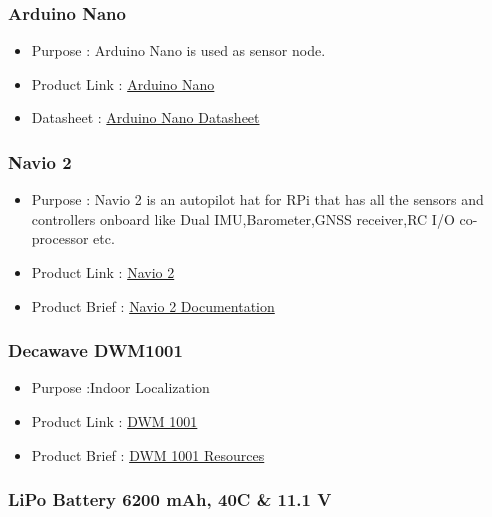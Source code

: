 \documentclass[a4paper,12pt,oneside]{book}
\begin{document}
 \subsubsection{Arduino Nano } 

\begin{itemize}
  \item Purpose : Arduino Nano is used as sensor node.
  \item Product Link : \href{https://robu.in/product/arduino-nano-v3-0-ch340-chip-mini-usb-cable/?gclid=CjwKCAjw4PHZBRA-EiwAAas4ZnkY1Uyx1regBeSCiAQphWNPrAL1DfNjwFlLTFBN2IuJMkXe9YMaixoCQcsQAvD_BwE}{Arduino Nano} 
  \item Datasheet : \href{https://www.arduino.cc/en/uploads/Main/ArduinoNanoManual23.pdf}{Arduino Nano Datasheet} 
 \end{itemize}

 \subsubsection{Navio 2 } 

\begin{itemize}
  \item Purpose : Navio 2 is an autopilot hat for RPi that has all the sensors and controllers onboard like Dual IMU,Barometer,GNSS receiver,RC I/O co-processor etc. 
  \item Product Link : \href{https://store.emlid.com/product/navio2/}{Navio 2} 
  \item Product Brief : \href{https://docs.emlid.com/navio2/}{Navio 2 Documentation} 
 \end{itemize}
 
 \subsubsection{Decawave DWM1001 } 

\begin{itemize}
  \item Purpose :Indoor Localization
  \item Product Link : \href{https://www.findchips.com/search/DWM1001?gclid=CjwKCAjw4PHZBRA-EiwAAas4ZtTtjHXX9dnmI99yqhUIe2f_LFBmznETxFEPqzojVR2hLfT5Xpz6JRoCmh8QAvD_BwE&gclsrc=aw.ds}{DWM 1001} 
  \item Product Brief : \href{https://www.decawave.com/products/dwm1001-module}{DWM 1001 Resources} 
 \end{itemize}
 
 \subsubsection{LiPo Battery 6200 mAh, 40C \& 11.1 V } 
\end{document}
